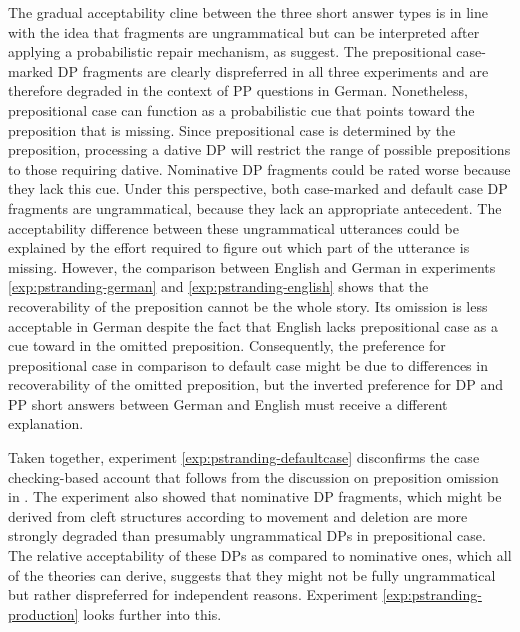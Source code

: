 \noindent The gradual acceptability cline between the three short answer types is in line with the idea that fragments are ungrammatical but can be interpreted after applying a probabilistic repair mechanism, as \citet{bergen.goodman2015} suggest. The prepositional case-marked DP fragments are clearly dispreferred in all three experiments and are therefore degraded in the context of PP questions in German. Nonetheless, prepositional case can function as a probabilistic cue that points toward the preposition that is missing. Since prepositional case is determined by the preposition, processing a dative DP will restrict the range of possible prepositions to those requiring dative. Nominative DP fragments could be rated worse because they lack this cue. Under this perspective, both case-marked and default case DP fragments are ungrammatical, because they lack an appropriate antecedent. The acceptability difference between these ungrammatical utterances could be explained by the effort required to figure out which part of the utterance is missing. However, the comparison between English and German in experiments \ref{exp:pstranding-german} and \ref{exp:pstranding-english} shows that the recoverability of the preposition cannot be the whole story. Its omission is less acceptable in German despite the fact that English lacks prepositional case as a cue toward in the omitted preposition. Consequently, the preference for prepositional case in comparison to default case might be due to differences in recoverability of the omitted preposition, but the inverted preference for DP and PP short answers between German and English must receive a different explanation. 

Taken together, experiment \ref{exp:pstranding-defaultcase} disconfirms the case checking-based account that follows from the discussion on preposition omission in \citet{barton.progovac2005}. The experiment also showed that nominative DP fragments, which might be derived from cleft structures according to movement and deletion are more strongly degraded than presumably ungrammatical DPs in prepositional case. The relative acceptability of these DPs as compared to nominative ones, which all of the theories can derive, suggests that they might not be fully ungrammatical but rather dispreferred for independent reasons. Experiment \ref{exp:pstranding-production} looks further into this.

